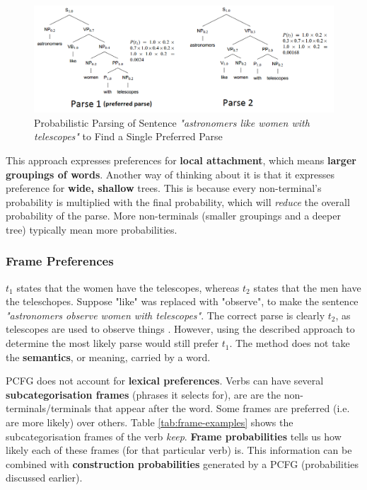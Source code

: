 \documentclass{article}
\begin{document}
\begin{figure}
	\centering
	\includegraphics[scale=0.55]{figures/example-probabilistic-parses.png}
	\caption{Probabilistic Parsing of Sentence \textit{"astronomers like women with telescopes"} to Find a Single Preferred Parse}
	\label{fig:example-probabilistic-parses}
\end{figure}

This approach expresses preferences for \textbf{local attachment}, which means \textbf{larger groupings of words}. Another way of thinking about it is that it expresses preference for \textbf{wide, shallow} trees. This is because every non-terminal's probability is multiplied with the final probability, which will \textit{reduce} the overall probability of the parse. More non-terminals (smaller groupings and a deeper tree) typically mean more probabilities.

\subsubsection{Frame Preferences}

$t_1$ states that the women have the telescopes, whereas $t_2$ states that the men have the teleschopes. Suppose "like" was replaced with "observe", to make the sentence \textit{"astronomers observe women with telescopes"}. The correct parse is clearly $t_2$, as telescopes are used to observe things . However, using the described approach to determine the most likely parse would still prefer $t_1$. The method does not take the \textbf{semantics}, or meaning, carried by a word.

PCFG does not account for \textbf{lexical preferences}. Verbs can have several \textbf{subcategorisation frames} (phrases it selects for), are are the non-terminals/terminals that appear after the word. Some frames are preferred (i.e. are more likely) over others. Table \ref{tab:frame-examples} shows the subcategorisation frames of the verb \textit{keep}. \textbf{Frame probabilities} tells us how likely each of these frames (for that particular verb) is. This information can be combined with \textbf{construction probabilities} generated by a PCFG (probabilities discussed earlier).
\end{document}
